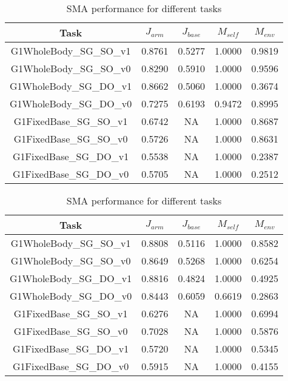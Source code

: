 \begin{table}[ht]
\vspace{0.5cm}

\begin{subtable}[ht]{\textwidth}
    \centering
    \caption{CBF performance for different tasks}
    \label{tb:cbf_task_scores}
    \begin{tabular}{c|cccc}
    \toprule
    \textbf{Task} & $J_{arm}$ & $J_{base}$ & $M_{self}$ & $M_{env}$ \\
    \midrule
    G1WholeBody\_SG\_SO\_v1 & 0.8761 & 0.5277 & 1.0000 & 0.9819 \\
    G1WholeBody\_SG\_SO\_v0 & 0.8290 & 0.5910 & 1.0000 & 0.9596 \\
    G1WholeBody\_SG\_DO\_v1 & 0.8662 & 0.5060 & 1.0000 & 0.3674 \\
    G1WholeBody\_SG\_DO\_v0 & 0.7275 & 0.6193 & 0.9472 & 0.8995 \\
    \midrule
    G1FixedBase\_SG\_SO\_v1 & 0.6742 & NA & 1.0000 & 0.8687 \\
    G1FixedBase\_SG\_SO\_v0 & 0.5726 & NA & 1.0000 & 0.8631 \\
    G1FixedBase\_SG\_DO\_v1 & 0.5538 & NA & 1.0000 & 0.2387 \\
    G1FixedBase\_SG\_DO\_v0 & 0.5705 & NA & 1.0000 & 0.2512 \\
    \bottomrule
    \end{tabular}
\end{subtable}


\vspace{0.5cm}

\begin{subtable}[ht]{\textwidth}
    \centering
    \caption{SMA performance for different tasks}
    \label{tb:sma_task_scores}
    \begin{tabular}{c|cccc}
    \toprule
    \textbf{Task} & $J_{arm}$ & $J_{base}$ & $M_{self}$ & $M_{env}$ \\
    \midrule
    G1WholeBody\_SG\_SO\_v1 & 0.8808 & 0.5116 & 1.0000 & 0.8582 \\
    G1WholeBody\_SG\_SO\_v0 & 0.8649 & 0.5268 & 1.0000 & 0.6254 \\
    G1WholeBody\_SG\_DO\_v1 & 0.8816 & 0.4824 & 1.0000 & 0.4925 \\
    G1WholeBody\_SG\_DO\_v0 & 0.8443 & 0.6059 & 0.6619 & 0.2863 \\
    \midrule
    G1FixedBase\_SG\_SO\_v1 & 0.6276 & NA & 1.0000 & 0.6994 \\
    G1FixedBase\_SG\_SO\_v0 & 0.7028 & NA & 1.0000 & 0.5876 \\
    G1FixedBase\_SG\_DO\_v1 & 0.5720 & NA & 1.0000 & 0.5345 \\
    G1FixedBase\_SG\_DO\_v0 & 0.5915 & NA & 1.0000 & 0.4155 \\
    \bottomrule
    \end{tabular}
\end{subtable}



\end{table}
